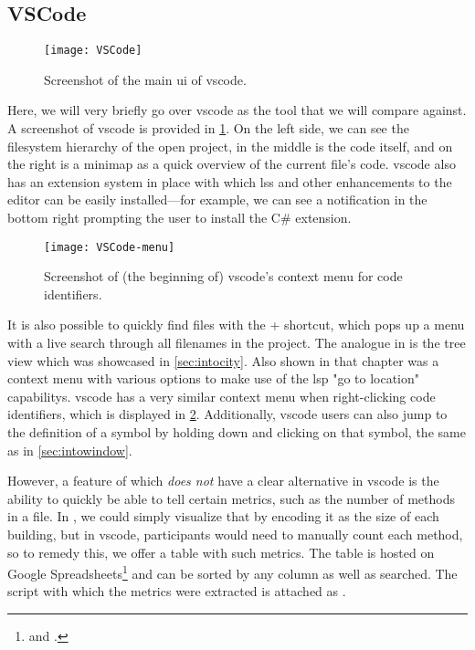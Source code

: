 \documentclass[../thesis]{subfiles}
\begin{document}
\subsection{VSCode}\label{subsec:vscode}

\begin{figure}[htbp]
	\begin{center}
		\texttt{[image: VSCode]}
	\end{center}
	\caption{Screenshot of the main \gls{ui} of \gls{vscode}.}\label{fig:vscode}
\end{figure}

Here, we will very briefly go over \gls{vscode} as the tool that we will compare \SEE{} against.
A screenshot of \gls{vscode} is provided in \cref{fig:vscode}.
On the left side, we can see the filesystem hierarchy of the open project, in the middle is the code itself, and on the right is a minimap as a quick overview of the current file's code.
\gls{vscode} also has an extension system in place with which \glspl{ls} and other enhancements to the editor can be easily installed---for example, we can see a notification in the bottom right prompting the user to install the C\# extension.

\begin{figure}[htbp]
	\begin{center}
		\texttt{[image: VSCode-menu]}
	\end{center}
	\caption{Screenshot of (the beginning of) \gls{vscode}'s context menu for code identifiers.}\label{fig:vscode_menu}
\end{figure}

It is also possible to quickly find files with the  +  shortcut, which pops up a menu with a live search through all filenames in the project.
The analogue in \SEE{} is the tree view which was showcased in \cref{sec:intocity}.
Also shown in that chapter was a context menu with various options to make use of the \gls{lsp} "go to location" \glspl{capability}.
\Gls{vscode} has a very similar context menu when right-clicking code identifiers, which is displayed in \cref{fig:vscode_menu}.
Additionally, \gls{vscode} users can also jump to the definition of a symbol by holding down  and clicking on that symbol, the same as in \cref{sec:intowindow}.

However, a feature of \SEE{} which \emph{does not} have a clear alternative in \gls{vscode} is the ability to quickly be able to tell certain metrics, such as the number of methods in a file.
In \SEE{}, we could simply visualize that by encoding it as the size of each building, but in \gls{vscode}, participants would need to manually count each method, so to remedy this, we offer a table with such metrics.
The table is hosted on Google Spreadsheets\footnote{
	 and .
} and can be sorted by any column as well as searched.
The script with which the metrics were extracted is attached as .
\end{document}
